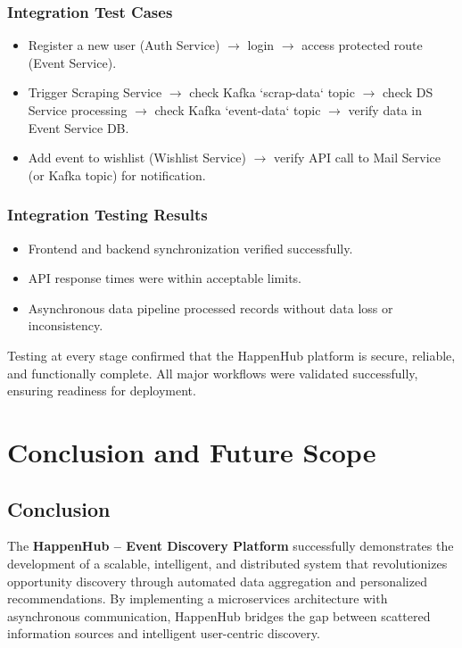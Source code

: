 \documentclass[12pt,a4paper]{report}
\begin{document}
\subsection*{Integration Test Cases}
\begin{itemize}
    \item Register a new user (Auth Service) $\rightarrow$ login $\rightarrow$ access protected route (Event Service).
    \item Trigger Scraping Service $\rightarrow$ check Kafka `scrap-data` topic $\rightarrow$ check DS Service processing $\rightarrow$ check Kafka `event-data` topic $\rightarrow$ verify data in Event Service DB.
    \item Add event to wishlist (Wishlist Service) $\rightarrow$ verify API call to Mail Service (or Kafka topic) for notification.
\end{itemize}

\subsection*{Integration Testing Results}
\begin{itemize}
    \item Frontend and backend synchronization verified successfully.
    \item API response times were within acceptable limits.
    \item Asynchronous data pipeline processed records without data loss or inconsistency.
\end{itemize}

\noindent
Testing at every stage confirmed that the HappenHub platform is secure, reliable, and functionally complete. All major workflows were validated successfully, ensuring readiness for deployment.



\chapter{Conclusion and Future Scope}

\section{Conclusion}

The \textbf{HappenHub – Event Discovery Platform} successfully demonstrates the
development of a scalable, intelligent, and distributed system that
revolutionizes opportunity discovery through automated data aggregation and
personalized recommendations. By implementing a microservices architecture with
asynchronous communication, HappenHub bridges the gap between scattered
information sources and intelligent user-centric discovery.
\end{document}
